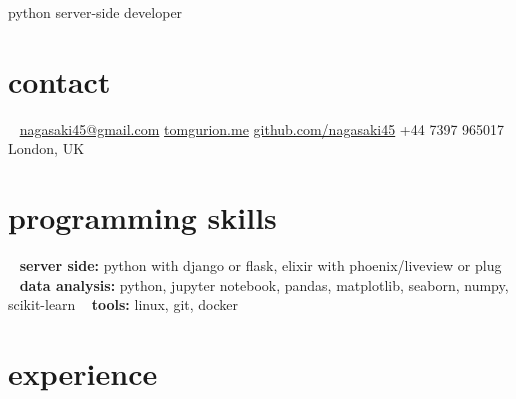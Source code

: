 \documentclass[]{friggeri-cv}
\begin{document}
       {python server-side developer}



\begin{aside}
\section{contact}
~
\href{mailto:nagasaki45@gmail.com}{nagasaki45@gmail.com}
\href{http://tomgurion.me}{tomgurion.me}
\href{https://github.com/nagasaki45}{github.com/nagasaki45}
+44 7397 965017
London, UK
~
\section{programming skills}
~
\textbf{server side:} python with django or flask, elixir with phoenix/liveview or plug
~
\textbf{data analysis:} python, jupyter notebook, pandas, matplotlib, seaborn, numpy, scikit-learn
~
\textbf{tools:} linux, git, docker
\end{aside}



\section{experience}
\end{document}
